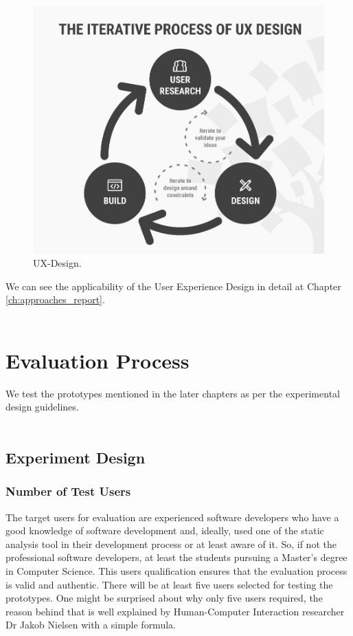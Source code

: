\begin{figure}[hbt!]
	\centering
	\includegraphics[width=\linewidth]{figures/ux-design}
	\caption{UX-Design.\cite{UXD}}
	\label{fig:ux-design}
\end{figure}

We can see the applicability of the User Experience Design in detail at Chapter \ref{ch:approaches_report}. \\ \\


\section{Evaluation Process}

We test the prototypes mentioned in the later chapters as per the experimental design guidelines. \\ \\

\subsection{Experiment Design}

\subsubsection{Number of Test Users}

The target users for evaluation are experienced software developers who have a good knowledge of software development and, ideally, used one of the static analysis tool in their development process or at least aware of it. So, if not the professional software developers, at least the students pursuing a Master’s degree in Computer Science. This users qualification ensures that the evaluation process is valid and authentic. There will be at least five users selected for testing the prototypes. One might be surprised about why only five users required, the reason behind that is well explained by Human-Computer Interaction researcher Dr Jakob Nielsen with a simple formula. \cite{five}

